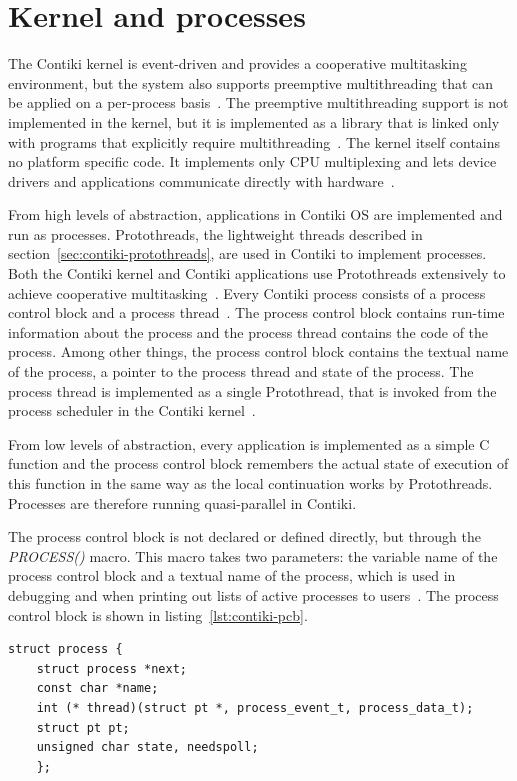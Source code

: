 
\section{Kernel and processes}\label{sec:contiki-kernel}
The Contiki kernel is event-driven and provides a cooperative multitasking
environment, but the system also supports preemptive
multithreading that can be applied on a per-process basis~\cite{paper-contiki}.
The preemptive multithreading support is not implemented in the kernel, but
it is implemented as a library that is linked only with programs that
explicitly require multithreading~\cite{paper-contiki}.
The kernel itself contains no platform specific code.
It implements only CPU multiplexing and
lets device drivers and applications communicate directly with hardware~\cite{paper-contiki}. %

From high levels of abstraction,
applications in Contiki OS are implemented and run as processes.
Protothreads, the lightweight threads described in section~\ref{sec:contiki-protothreads},
are used in Contiki to implement processes.
Both the Contiki kernel and Contiki applications use
Protothreads extensively to achieve cooperative multitasking~\cite{contiki-wiki-faq}.
Every Contiki process consists of a process control block and a process thread~\cite{contiki-wiki-processes}.
The process control block contains run-time information about the process and
the process thread contains the code of the process.
Among other things, the process control block contains
the textual name of the process, a pointer to the process thread and state of the process.
The process thread is implemented as a single Protothread,
that is invoked from the process scheduler in the Contiki kernel~\cite{contiki-wiki-processes}.

From low levels of abstraction,
every application is implemented as a simple C function
and the process control block remembers the actual state of execution of this function
in the same way as the local continuation works by Protothreads.
Processes are therefore running quasi-parallel in Contiki.

The process control block is not declared or defined directly,
but through the {\it{PROCESS()}} macro.
This macro takes two parameters: the variable name of the process control block
and a textual name of the process,
which is used in debugging and when printing out lists of active processes to users~\cite{contiki-wiki-processes}.
The process control block is shown in listing~\ref{lst:contiki-pcb}.
\bigskip
\begin{lstlisting}[caption={Process control block in Contiki OS},label={lst:contiki-pcb}]
struct process {
	struct process *next;
	const char *name;
	int (* thread)(struct pt *, process_event_t, process_data_t);
	struct pt pt;
	unsigned char state, needspoll;
	};
\end{lstlisting}

